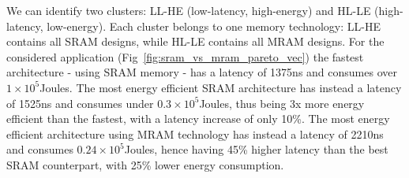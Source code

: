 We can identify two clusters: LL-HE (low-latency, high-energy) and HL-LE (high-latency, low-energy). Each cluster belongs to one memory technology: LL-HE contains all SRAM designs, while HL-LE contains all MRAM designs.
For the considered application (Fig~\ref{fig:sram_vs_mram_pareto_vec}) the fastest architecture - using SRAM memory - has a latency of 1375ns and consumes over $1\times10^5$Joules. The most energy efficient SRAM architecture has instead a latency of 1525ns and consumes under $0.3\times10^5$Joules, thus being 3x more energy efficient than the fastest, with a latency increase of only 10\%. The most energy efficient architecture using MRAM technology has instead a latency of 2210ns and consumes $0.24\times10^5$Joules, hence having 45\% higher latency than the best SRAM counterpart, with 25\% lower energy consumption.





